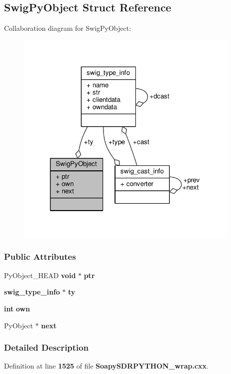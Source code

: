 \subsection{Swig\+Py\+Object Struct Reference}
\label{structSwigPyObject}


Collaboration diagram for Swig\+Py\+Object\+:
\nopagebreak
\begin{figure}[H]
\begin{center}
\leavevmode
\includegraphics[width=306pt]{de/d47/structSwigPyObject__coll__graph}
\end{center}
\end{figure}
\subsubsection*{Public Attributes}
\begin{DoxyCompactItemize}
\item 
Py\+Object\+\_\+\+H\+E\+AD {\bf void} $\ast$ {\bf ptr}
\item 
{\bf swig\+\_\+type\+\_\+info} $\ast$ {\bf ty}
\item 
{\bf int} {\bf own}
\item 
Py\+Object $\ast$ {\bf next}
\end{DoxyCompactItemize}


\subsubsection{Detailed Description}


Definition at line {\bf 1525} of file {\bf Soapy\+S\+D\+R\+P\+Y\+T\+H\+O\+N\+\_\+wrap.\+cxx}.



